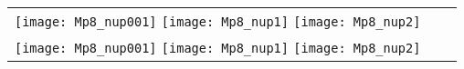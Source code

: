 \documentclass[aps,preprint]{revtex4}
\begin{document}
\nonumber
\thispagestyle{empty}

%
%



\begin{tabular}{ccc}
\hspace*{-3.2cm}
\vspace{-0.51cm}
\texttt{[image: Mp8\_nup001]}
\texttt{[image: Mp8\_nup1]}
\texttt{[image: Mp8\_nup2]}\\
\hspace*{-0.78cm}
\vspace{-5cm}
\texttt{[image: Mp8\_nup001]}
\hspace{2.29cm}
\texttt{[image: Mp8\_nup1]}
\hspace{2.3cm}
\texttt{[image: Mp8\_nup2]}

\end{tabular} 
\end{document}
